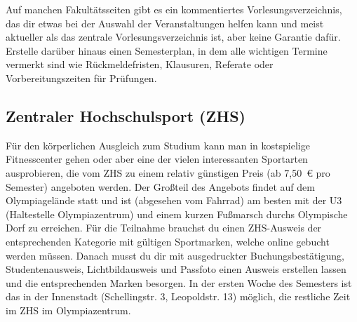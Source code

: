 Auf manchen Fakultätsseiten gibt es ein kommentiertes Vorlesungsverzeichnis, das dir etwas bei der Auswahl der Veranstaltungen helfen kann und meist aktueller als das zentrale Vorlesungsverzeichnis ist, aber keine Garantie dafür. Erstelle darüber hinaus einen Semesterplan, in dem alle wichtigen Termine vermerkt sind wie Rückmeldefristen, Klausuren, Referate oder Vorbereitungszeiten für Prüfungen.
	


\clearpage


\subsection{Zentraler Hochschulsport (ZHS)}

Für den körperlichen Ausgleich zum Studium kann man in kostspielige Fitnesscenter gehen oder aber eine der vielen interessanten Sportarten ausprobieren, die vom ZHS zu einem relativ günstigen Preis (ab 7,50~€ pro Semester) angeboten werden. Der Großteil des Angebots findet auf dem Olympiagelände statt und ist (abgesehen vom Fahrrad) am besten mit der U3 (Haltestelle Olympiazentrum) und einem kurzen Fußmarsch durchs Olympische Dorf zu erreichen. Für die Teilnahme brauchst du einen ZHS-Ausweis der entsprechenden Kategorie mit gültigen Sportmarken, welche online gebucht werden müssen. Danach musst du dir mit ausgedruckter Buchungsbestätigung, Studentenausweis, Lichtbildausweis und Passfoto einen Ausweis erstellen lassen und die entsprechenden Marken besorgen. In der ersten Woche des Semesters ist das in der Innenstadt (Schellingstr. 3, Leopoldstr. 13) möglich, die restliche Zeit im ZHS im Olympiazentrum. 

